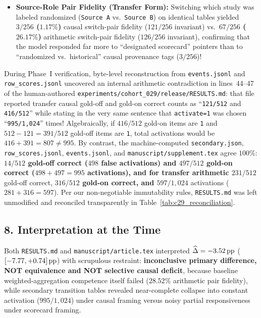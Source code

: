 \begin{itemize}
\begin{itemize}
    \end{itemize}
  \item \textbf{Source-Role Pair Fidelity (Transfer Form):} Switching which study was labeled randomized (\texttt{Source A} vs.\ \texttt{Source B}) on identical tables yielded \textbf{$3/256$ ($1.17\%$)} causal switch-pair fidelity ($121/256$ invariant) vs.\ \textbf{$67/256$ ($26.17\%$)} arithmetic switch-pair fidelity ($126/256$ invariant), confirming that the model responded far more to ``designated scorecard'' pointers than to ``randomized vs.\ historical'' causal provenance tags ($3/256$)!
\end{itemize}

\begin{auditcallout}
During Phase~I verification, byte-level reconstruction from \texttt{events.jsonl} and \texttt{row\_scores.jsonl} uncovered an internal arithmetic contradiction in lines~44--47 of the human-authored \texttt{experiments/cohort\_029/release/RESULTS.md}: that file reported transfer causal gold-off and gold-on correct counts as ``\texttt{121/512} and \texttt{416/512}'' while stating in the very same sentence that \texttt{activate=1} was chosen ``\texttt{995/1,024}'' times! Algebraically, if $416/512$ gold-on items are \texttt{1} and $512 - 121 = 391/512$ gold-off items are \texttt{1}, total activations would be $416 + 391 = 807 \neq 995$. By contrast, the machine-computed \texttt{secondary.json}, \texttt{row\_scores.jsonl}, \texttt{events.jsonl}, and \texttt{manuscript/supplement.tex} agree $100\%$: \textbf{$14/512$\textbf{ gold-off correct ($498$ false activations) and }$497/512$\textbf{ gold-on correct ($498 + 497 = 995$ activations), and for transfer arithmetic }$231/512$} gold-off correct, \textbf{$316/512$\textbf{ gold-on correct, and }$597/1{,}024$} activations ($281 + 316 = 597$). Per our non-negotiable immutability rules, \texttt{RESULTS.md} was left unmodified and reconciled transparently in Table~\ref{tab:c29_reconciliation}.
\end{auditcallout}

\subsection*{8. Interpretation at the Time}
Both \texttt{RESULTS.md} and \texttt{manuscript/article.tex} interpreted $\widehat{\Delta} = -3.52\,\mathrm{pp}$ ($[-7.77, +0.74]\,\mathrm{pp}$) with scrupulous restraint: \textbf{inconclusive primary difference, NOT equivalence and NOT selective causal deficit}, because baseline weighted-aggregation competence itself failed ($28.52\%$ arithmetic pair fidelity), while secondary transition tables revealed near-complete collapse into constant activation ($995/1{,}024$) under causal framing versus noisy partial responsiveness under scorecard framing.

